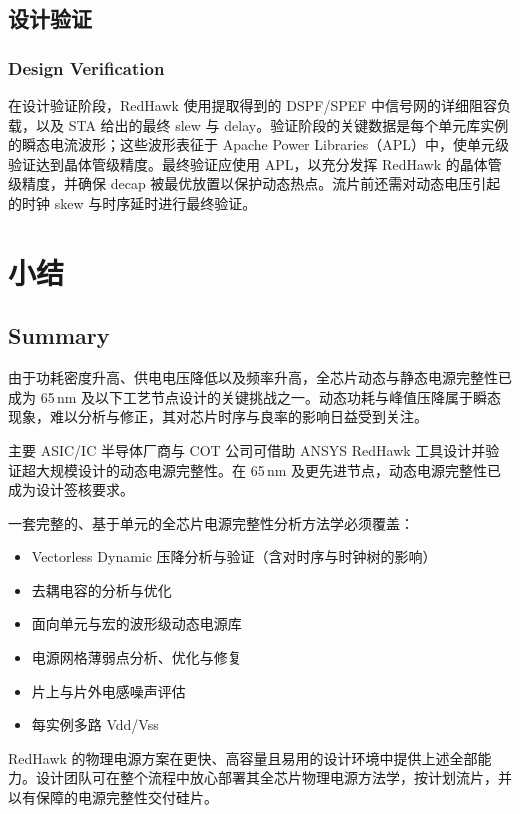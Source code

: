 \subsection{设计验证}
\subsubsection*{Design Verification}

在设计验证阶段，RedHawk 使用提取得到的 DSPF/SPEF 中信号网的详细阻容负载，以及 STA 给出的最终 slew 与 delay。验证阶段的关键数据是每个单元库实例的瞬态电流波形；这些波形表征于 Apache Power Libraries（APL）中，使单元级验证达到晶体管级精度。最终验证应使用 APL，以充分发挥 RedHawk 的晶体管级精度，并确保 decap 被最优放置以保护动态热点。流片前还需对动态电压引起的时钟 skew 与时序延时进行最终验证。

\section{小结}
\subsection*{Summary}

由于功耗密度升高、供电电压降低以及频率升高，全芯片动态与静态电源完整性已成为 65\,nm 及以下工艺节点设计的关键挑战之一。动态功耗与峰值压降属于瞬态现象，难以分析与修正，其对芯片时序与良率的影响日益受到关注。

主要 ASIC/IC 半导体厂商与 COT 公司可借助 ANSYS RedHawk 工具设计并验证超大规模设计的动态电源完整性。在 65\,nm 及更先进节点，动态电源完整性已成为设计签核要求。

一套完整的、基于单元的全芯片电源完整性分析方法学必须覆盖：
\begin{itemize}
  \item Vectorless Dynamic 压降分析与验证（含对时序与时钟树的影响）
  \item 去耦电容的分析与优化
  \item 面向单元与宏的波形级动态电源库
  \item 电源网格薄弱点分析、优化与修复
  \item 片上与片外电感噪声评估
  \item 每实例多路 Vdd/Vss
\end{itemize}

RedHawk 的物理电源方案在更快、高容量且易用的设计环境中提供上述全部能力。设计团队可在整个流程中放心部署其全芯片物理电源方法学，按计划流片，并以有保障的电源完整性交付硅片。
